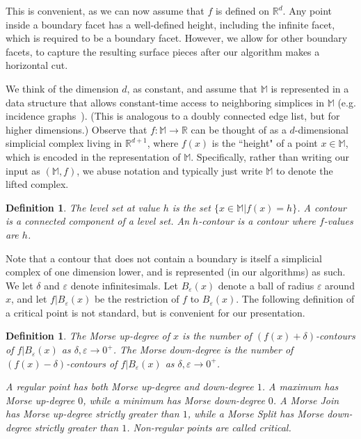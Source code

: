 \documentclass[11pt]{article}
\newtheorem{definition}[theorem]{Definition}
\theoremstyle{definition}
\newcommand{\MM}{\mathbb{M}}
\newcommand{\RR}{\mathbb{R}}
\newcommand{\eps}{\varepsilon}
\begin{document}
This is convenient, as we can now assume that $f$ is defined on $\RR^d$. Any point inside a boundary facet
has a well-defined height, including the infinite facet, which is required to be a boundary facet.  However, 
we allow for other boundary facets, to capture the resulting surface pieces after our algorithm makes a horizontal cut. 

We think of the dimension $d$, as constant, and assume that $\MM$ is represented in a data structure that allows constant-time access to neighboring simplices
in $\MM$ (e.g. incidence graphs~\cite{Ed87}). (This is analogous to a doubly connected edge list, but for higher dimensions.)
Observe that $f:\MM \rightarrow \RR$ can be thought of as a $d$-dimensional simplicial complex living in $\RR^{d+1}$, 
where $f(x)$ is the ``height" of a point $x \in \MM$, which is encoded in the representation of $\MM$. 
Specifically, rather than writing our input as $(\MM,f)$, we abuse notation and typically just write $\MM$ to denote the lifted complex.

\begin{definition} \label{def:level} The \emph{level set} at value $h$ is the set $\{x\in \MM| f(x) = h\}$.
A \emph{contour} is a connected component of a level set. An \emph{$h$-contour} is a contour where $f$-values are $h$.
\end{definition}

Note that a contour that does not contain a boundary is itself a simplicial complex of one dimension lower, and is represented (in our algorithms) as such.
We let $\delta$ and $\eps$ denote infinitesimals. Let $B_\eps(x)$ denote a ball of radius $\eps$ around $x$, and let 
$f|B_\eps(x)$ be the restriction of $f$ to $B_\eps(x)$.
The following definition of a critical point is not standard,
but is convenient for our presentation.

\begin{definition} \label{def:deg} The \emph{Morse up-degree} of $x$ is the number of $(f(x) + \delta)$-contours of $f|B_\eps(x)$
as $\delta, \eps \rightarrow 0^+$. The \emph{Morse down-degree} is the number of $(f(x) - \delta)$-contours of $f|B_\eps(x)$
as $\delta, \eps \rightarrow 0^+$.

A \emph{regular} point has both Morse up-degree and down-degree $1$. A \emph{maximum} has Morse up-degree $0$, while
a \emph{minimum} has Morse down-degree $0$. A \emph{Morse Join} has Morse up-degree strictly greater than $1$,
while a \emph{Morse Split} has Morse down-degree strictly greater than $1$. Non-regular points are called \emph{critical}.
\end{definition}
\end{document}
